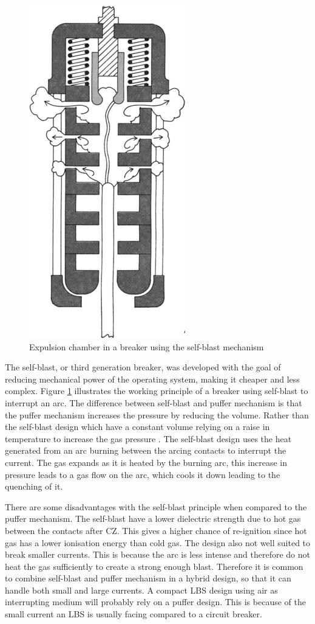 \documentclass[10pt,a4paper]{article} %
\begin{document}
\begin{figure} [H]
\centering
\includegraphics[scale=0.4]{Bilder/Theory/selfBlast.png}
\caption{Expulsion chamber in a breaker using the self-blast mechanism \cite{bib:CBAC}} \label{fig:selfBlast}
\end{figure}

The self-blast, or third generation breaker, was developed with the goal of reducing mechanical power of the operating system, making it cheaper and less complex. Figure \ref{fig:selfBlast} illustrates the working principle of a breaker using self-blast to interrupt an arc. The difference between self-blast and puffer mechanism is that the puffer mechanism increases the pressure by reducing the volume. Rather than the self-blast design which have a constant volume relying on a raise in temperature to increase the gas pressure \cite{bib:CBAC}. The self-blast design uses the heat generated from an arc burning between the arcing contacts to interrupt the current. The gas expands as it is heated by the burning arc, this increase in pressure leads to a gas flow on the arc, which cools it down leading to the quenching of it.

There are some disadvantages with the self-blast principle when compared to the puffer mechanism. The self-blast have a lower dielectric strength due to hot gas between the contacts after CZ. This gives a higher chance of re-ignition since hot gas has a lower ionisation energy than cold gas. The design also not well suited to break smaller currents. This is because the arc is less intense and therefore do not heat the gas sufficiently to create a strong enough blast. Therefore it is common to combine self-blast and puffer mechanism in a hybrid design, so that it can handle both small and large currents. A compact LBS design using air as interrupting medium will probably rely on a puffer design. This is because of the small current an LBS is usually facing compared to a circuit breaker.
\end{document}
